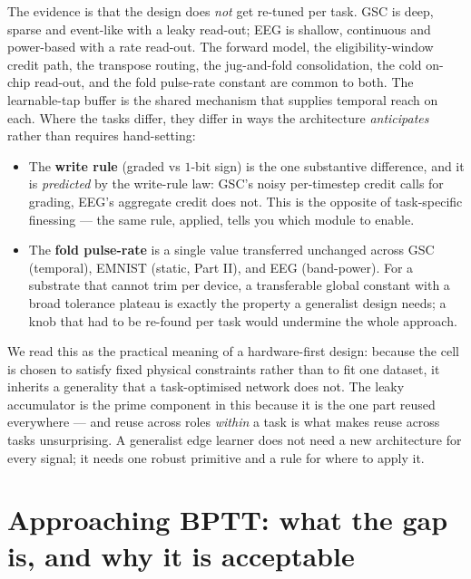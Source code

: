 \documentclass[11pt]{article}
\providecommand{\tightlist}{\setlength{\itemsep}{0pt}\setlength{\parskip}{0pt}}
\begin{document}
The evidence is that the design does \emph{not} get re-tuned per task.
GSC is deep, sparse and event-like with a leaky read-out; EEG is
shallow, continuous and power-based with a rate read-out. The forward
model, the eligibility-window credit path, the transpose routing, the
jug-and-fold consolidation, the cold on-chip read-out, and the fold
pulse-rate constant are common to both. The learnable-tap buffer is the
shared mechanism that supplies temporal reach on each. Where the tasks
differ, they differ in ways the architecture \emph{anticipates} rather
than requires hand-setting:

\begin{itemize}
\tightlist
\item
  The \textbf{write rule} (graded vs \(1\)-bit sign) is the one
  substantive difference, and it is \emph{predicted} by the write-rule
  law: GSC's noisy per-timestep credit calls for grading, EEG's
  aggregate credit does not. This is the opposite of task-specific
  finessing --- the same rule, applied, tells you which module to
  enable.
\item
  The \textbf{fold pulse-rate} is a single value transferred unchanged
  across GSC (temporal), EMNIST (static, Part II), and EEG (band-power).
  For a substrate that cannot trim per device, a transferable global
  constant with a broad tolerance plateau is exactly the property a
  generalist design needs; a knob that had to be re-found per task would
  undermine the whole approach.
\end{itemize}

We read this as the practical meaning of a hardware-first design:
because the cell is chosen to satisfy fixed physical constraints rather
than to fit one dataset, it inherits a generality that a task-optimised
network does not. The leaky accumulator is the prime component in this
because it is the one part reused everywhere --- and reuse across roles
\emph{within} a task is what makes reuse across tasks unsurprising. A
generalist edge learner does not need a new architecture for every
signal; it needs one robust primitive and a rule for where to apply it.

\hypertarget{sec:gap}{%
\section{Approaching BPTT: what the gap is, and why it is
acceptable}\label{sec:gap}}
\end{document}
